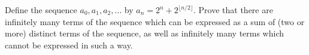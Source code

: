 Define the sequence $a_0,a_1,a_2,\ldots$ by $a_n=2^n+2^{\lfloor n/2\rfloor}$. Prove that there are infinitely many terms of the sequence which can be expressed as a sum of (two or more) distinct terms of the sequence, as well as infinitely many terms which cannot be expressed in such a way.
